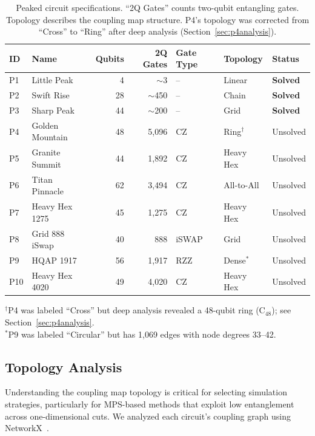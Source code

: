 \documentclass[11pt,a4paper]{article}
\begin{document}
\begin{table}[H]
\centering
\caption{Peaked circuit specifications. ``2Q Gates'' counts two-qubit entangling gates. Topology describes the coupling map structure. P4's topology was corrected from ``Cross'' to ``Ring'' after deep analysis (Section~\ref{sec:p4analysis}).}
\label{tab:circuits}
\begin{tabular}{@{}llrrlll@{}}
\toprule
ID & Name & Qubits & 2Q Gates & Gate Type & Topology & Status \\
\midrule
P1 & Little Peak & 4 & $\sim$3 & -- & Linear & \textcolor{green!60!black}{\textbf{Solved}} \\
P2 & Swift Rise & 28 & $\sim$450 & -- & Chain & \textcolor{green!60!black}{\textbf{Solved}} \\
P3 & Sharp Peak & 44 & $\sim$200 & -- & Grid & \textcolor{green!60!black}{\textbf{Solved}} \\
\midrule
P4 & Golden Mountain & 48 & 5{,}096 & CZ & Ring$^\dagger$ & Unsolved \\
P5 & Granite Summit & 44 & 1{,}892 & CZ & Heavy Hex & Unsolved \\
P6 & Titan Pinnacle & 62 & 3{,}494 & CZ & All-to-All & Unsolved \\
P7 & Heavy Hex 1275 & 45 & 1{,}275 & CZ & Heavy Hex & Unsolved \\
P8 & Grid 888 iSwap & 40 & 888 & iSWAP & Grid & Unsolved \\
P9 & HQAP 1917 & 56 & 1{,}917 & RZZ & Dense$^*$ & Unsolved \\
P10 & Heavy Hex 4020 & 49 & 4{,}020 & CZ & Heavy Hex & Unsolved \\
\bottomrule
\end{tabular}

\smallskip
\footnotesize{$^\dagger$P4 was labeled ``Cross'' but deep analysis revealed a 48-qubit ring (C$_{48}$); see Section~\ref{sec:p4analysis}.}\\
\footnotesize{$^*$P9 was labeled ``Circular'' but has 1{,}069 edges with node degrees 33--42.}
\end{table}

\subsection{Topology Analysis}
\label{sec:topology}

Understanding the coupling map topology is critical for selecting simulation strategies, particularly for MPS-based methods that exploit low entanglement across one-dimensional cuts. We analyzed each circuit's coupling graph using NetworkX~\cite{hagberg2008exploring}.
\end{document}
